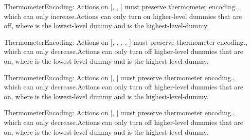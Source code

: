 \begin{constraints}
\item ThermometerEncoding: Actions on [, , ] must preserve thermometer encoding., which can only increase.Actions can only turn on higher-level dummies that are off, where  is the lowest-level dummy and  is the highest-level-dummy.
\item ThermometerEncoding: Actions on [, , , , ] must preserve thermometer encoding., which can only decrease.Actions can only turn off higher-level dummies that are on, where  is the lowest-level dummy and  is the highest-level-dummy.
\item ThermometerEncoding: Actions on [, ] must preserve thermometer encoding., which can only decrease.Actions can only turn off higher-level dummies that are on, where  is the lowest-level dummy and  is the highest-level-dummy.
\item ThermometerEncoding: Actions on [, ] must preserve thermometer encoding., which can only decrease.Actions can only turn off higher-level dummies that are on, where  is the lowest-level dummy and  is the highest-level-dummy.
\end{constraints}